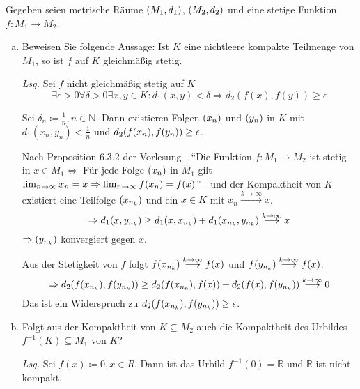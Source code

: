 \documentclass{scrreprt}
\begin{document}
Gegeben seien metrische Räume $\qty(M_1, d_1)$, $\qty(M_2, d_2)$ und eine
stetige Funktion $f \colon M_1 \to M_2$.
\begin{enumerate}[a)]
\item Beweisen Sie folgende Aussage:
  Ist $K$ eine nichtleere kompakte Teilmenge von $M_1$, so ist $f$ auf $K$
  gleichmäßig stetig.

  \textit{Lsg.} Sei $f$ nicht gleichmäßig stetig auf $K$
  \[
    \exists \epsilon > 0 \forall \delta > 0 \exists x, y \in K \colon
    d_1(x, y) < \delta \Rightarrow d_2(f(x), f(y)) \geq \epsilon
  \]

  Sei $\delta_n \coloneqq \frac{1}{n}, n \in \mathbb{N}$.
  Dann existieren Folgen $\qty(x_n)$ und $\qty(y_n)$ in $K$ mit
  $d_1(x_n, y_n) < \frac{1}{n}$ und
  $d_2 \qty(f\qty(x_n), f\qty(y_n)) \geq \epsilon$.

  Nach Proposition 6.3.2 der Vorlesung -
  ``Die Funktion $f \colon M_1 \to M_2$ ist stetig in $x \in M_1 \iff $
  Für jede Folge $\qty(x_n)$ in $M_1$ gilt
  $\lim_{n \to \infty} x_n = x \Rightarrow \lim_{n \to \infty} f\qty(x_n) = f(x)$''
  - und der Kompaktheit von $K$ existiert eine Teilfolge $\qty(x_{n_k})$
  und ein $x \in K$ mit $x_n \overset{k \to \infty}\longrightarrow x$.
  \[
    \Rightarrow d_1\qty(x, y_{n_k}) \geq d_1\qty(x, x_{n_k}) + d_1\qty(x_{n_k}, y_{n_k})
    \overset{k \to \infty}\longrightarrow x
  \]
  $\Rightarrow \qty(y_{n_k})$ konvergiert gegen $x$.

  Aus der Stetigkeit von $f$ folgt
  $f\qty(x_{n_k}) \overset{k \to \infty}\longrightarrow f(x)$ und
  $f\qty(y_{n_k}) \overset{k \to \infty}\longrightarrow f(x)$.
  \[
    \Rightarrow d_2\qty(f\qty(x_{n_k}), f\qty(y_{n_k}))
    \geq d_2\qty(f\qty(x_{n_k}), f(x)) + d_2\qty(f(x), f\qty(y_{n_k}))
    \overset{k \to \infty}\longrightarrow 0
  \]
  Das ist ein Widerspruch zu $d_2\qty(f\qty(x_{n_k}), f\qty(y_{n_k})) \geq \epsilon$.

\item Folgt aus der Kompaktheit von $K \subseteq M_2$ auch die Kompaktheit
  des Urbildes $f^{-1}(K) \subseteq M_1$ von $K$?

  \textit{Lsg.} Sei $f(x) \coloneqq 0, x \in R$.
  Dann ist das Urbild $f^{-1}(\qty{0}) = \mathbb{R}$ und $\mathbb{R}$ ist nicht kompakt.

\end{enumerate}
\end{document}

